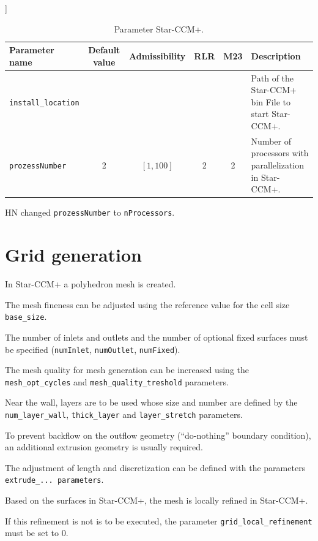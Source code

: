 \documentclass[a4paper,oneside]{book}
\numberwithin{equation}{section}
\begin{document}
\begin{table}[!htbp]]
\centering
\begin{tabular}{|l|c|c|c|c|p{6cm}|}
\hline 
\cellcolor{light-gray}\textbf{Parameter name} & \cellcolor{light-gray}\textbf{Default value} & \cellcolor{light-gray}\textbf{Admissibility} & \cellcolor{light-gray}\textbf{RLR} & \cellcolor{light-gray}\textbf{M23} & \cellcolor{light-gray}\textbf{Description} \\ 
\hline 
\verb|install_location| &  &  &  &  & Path of the  Star-CCM+ bin File to start Star-CCM+. \\ 
\hline 
\texttt{prozessNumber} & 2 & $[1,100]$ & 2 & 2 & Number of processors with parallelization in  Star-CCM+.\\ 
\hline 
\end{tabular} 
\caption{Parameter Star-CCM+.}
\end{table}
HN changed \texttt{prozessNumber} to \texttt{nProcessors}.

\section{Grid generation}
In Star-CCM+ a polyhedron mesh is created.

The mesh fineness can be adjusted using the reference value for the cell size \verb|base_size|.

The number of inlets and outlets and the number of optional fixed surfaces must be specified (\texttt{numInlet}, \texttt{numOutlet}, \texttt{numFixed}).

The mesh quality for mesh generation can be increased using the \verb|mesh_opt_cycles| and \verb|mesh_quality_treshold| parameters.

Near the wall, layers are to be used whose size and number are defined by the \verb|num_layer_wall|, \verb|thick_layer| and \verb|layer_stretch| parameters.

To prevent backflow on the outflow geometry (``do-nothing'' boundary condition), an additional extrusion geometry is usually required.

The adjustment of length and discretization can be defined with the parameters \verb|extrude_... parameters|.

Based on the surfaces in Star-CCM+, the mesh is locally refined in Star-CCM+. 

If this refinement is not is to be executed, the parameter \verb|grid_local_refinement| must be set to 0.
\end{document}
